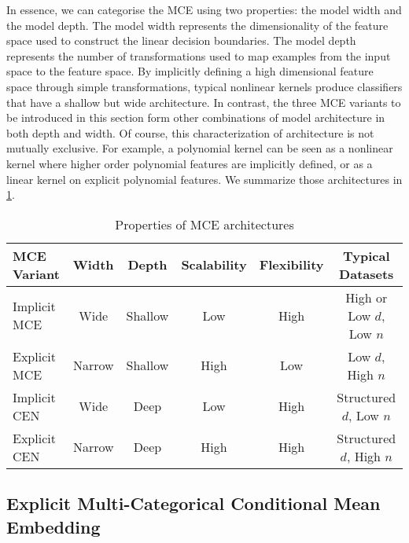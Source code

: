 \documentclass{llncs}
\numberwithin{equation}{section}
\numberwithin{table}{section}
\numberwithin{algorithm}{section}
\begin{document}
	In essence, we can categorise the \gls{MCE} using two properties: the model width and the model depth. The model width represents the dimensionality of the feature space used to construct the linear decision boundaries. The model depth represents the number of transformations used to map examples from the input space to the feature space. By implicitly defining a high dimensional feature space through simple transformations, typical nonlinear kernels produce classifiers that have a shallow but wide architecture. In contrast, the three \gls{MCE} variants to be introduced in this section form other combinations of model architecture in both depth and width. Of course, this characterization of architecture is not mutually exclusive. For example, a polynomial kernel can be seen as a nonlinear kernel where higher order polynomial features are implicitly defined, or as a linear kernel on explicit polynomial features. We summarize those architectures in \cref{tab:multiclass_conditional_embedding_variants}.
	
	\begin{table}[h]
		\caption{Properties of \gls{MCE} architectures}
		\label{tab:multiclass_conditional_embedding_variants}
		\centering
		\begin{tabular}{lccccc}
			\gls{MCE} Variant & Width & Depth & Scalability & Flexibility & Typical Datasets  \\
			\midrule
			Implicit \gls{MCE} & Wide & Shallow & Low & High & High or Low $d$, Low $n$ \\
			Explicit \gls{MCE} & Narrow & Shallow & High & Low & Low $d$, High $n$ \\
			Implicit \gls{CEN} &  Wide & Deep & Low & High & Structured $d$, Low $n$ \\
			Explicit \gls{CEN} & Narrow & Deep & High & High & Structured $d$, High $n$ \\ 
		\end{tabular}
	\end{table}
	
	\subsection{Explicit Multi-Categorical Conditional Mean Embedding}
	\label{app:explicit_multiclass_conditional_embedding}
	
\end{document}
